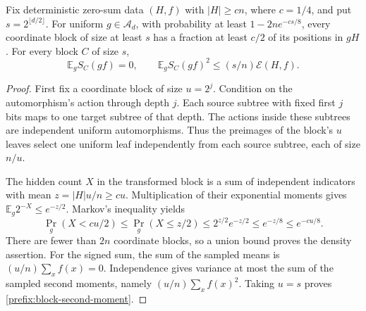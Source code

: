 \begin{lemma}\label{prefix:sampling}
Fix deterministic zero-sum data $(H,f)$ with $|H|\ge cn$, where
$c=1/4$, and put $s=2^{\lfloor d/2\rfloor}$.  For uniform
$g\in\mathcal A_d$, with probability at least
$1-2n e^{-cs/8}$, every coordinate block of size at least $s$ has
a fraction at least $c/2$ of its positions in $gH$. For every block $C$ of size
$s$,
\begin{equation}\label{prefix:block-second-moment}
 \mathbb E_g S_C(gf)=0,\qquad
 \mathbb E_g S_C(gf)^2\le(s/n)\mathcal E(H,f).
\end{equation}
\end{lemma}
\begin{proof}
First fix a coordinate block of size $u=2^j$.  Condition on the
automorphism's action through depth $j$.  Each source subtree with
fixed first $j$ bits maps to one target subtree of that depth.  The
actions inside these subtrees are independent uniform automorphisms.
Thus the preimages of the block's $u$ leaves select one uniform
leaf independently from each source subtree, each of size $n/u$.

The hidden count $X$ in the transformed block is a sum of independent
indicators with mean $z=|H|u/n\ge cu$.  Multiplication of their
exponential moments gives
$\mathbb E_g 2^{-X}\le e^{-z/2}$.  Markov's inequality yields
\[
 \Pr_g(X<cu/2)\le\Pr_g(X\le z/2)
 \le 2^{z/2}e^{-z/2}\le e^{-z/8}\le e^{-cu/8}.
\]
There are fewer than $2n$ coordinate blocks, so a union bound proves
the density assertion.  For the signed sum, the sum of the sampled
means is $(u/n)\sum_xf(x)=0$.  Independence gives variance at most
the sum of the sampled second moments, namely
$(u/n)\sum_xf(x)^2$.  Taking $u=s$ proves
\eqref{prefix:block-second-moment}.
\end{proof}

